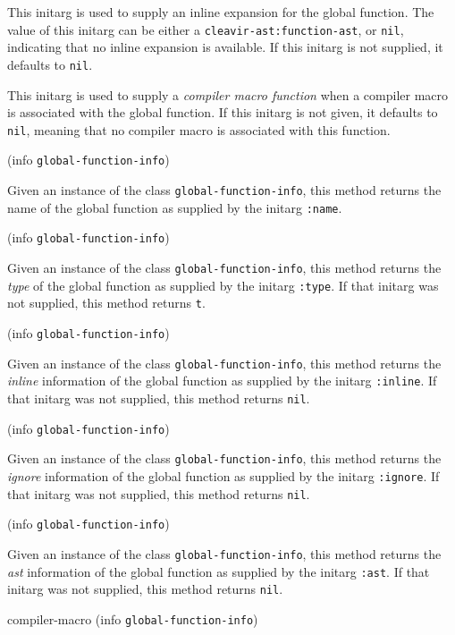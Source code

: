 
This initarg is used to supply an inline expansion for the global
function. The value of this initarg can be either a
\texttt{cleavir-ast:function-ast}, or \texttt{nil}, indicating that
no inline expansion is available. If this initarg is not supplied,
it defaults to \texttt{nil}.


This initarg is used to supply a \emph{compiler macro function} when
a compiler macro is associated with the global function.  If this
initarg is not given, it defaults to \texttt{nil}, meaning that no
compiler macro is associated with this function. 

 {(info {\tt global-function-info})}

Given an instance of the class \texttt{global-function-info}, this
method returns the name of the global function as supplied by the
initarg \texttt{:name}.

 {(info {\tt global-function-info})}

Given an instance of the class \texttt{global-function-info}, this
method returns the \emph{type} of the global function as supplied by the
initarg \texttt{:type}.  If that initarg was not supplied, this method
returns \texttt{t}.

 {(info {\tt global-function-info})}

Given an instance of the class \texttt{global-function-info}, this
method returns the \emph{inline} information of the global function as
supplied by the initarg \texttt{:inline}.  If that initarg was not
supplied, this method returns \texttt{nil}.

 {(info {\tt global-function-info})}

Given an instance of the class \texttt{global-function-info}, this
method returns the \emph{ignore} information of the global function as
supplied by the initarg \texttt{:ignore}.  If that initarg was not
supplied, this method returns \texttt{nil}.

 {(info {\tt global-function-info})}

Given an instance of the class \texttt{global-function-info}, this method returns the \emph{ast} information of the global function as supplied by the initarg \texttt{:ast}. If that initarg was not supplied, this method returns \texttt{nil}.

\Defmethod compiler-macro {(info {\tt global-function-info})}

